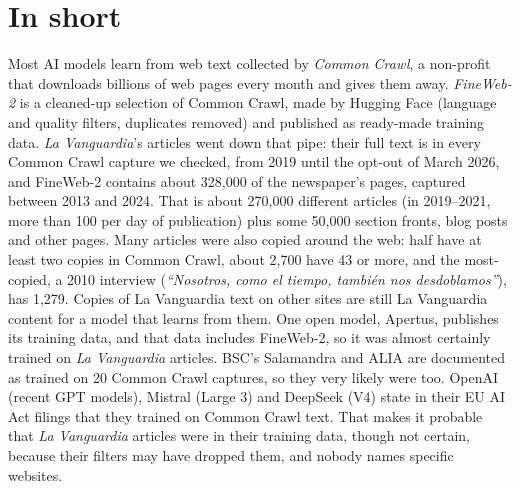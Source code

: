 \documentclass[10pt,a4paper]{article}
\begin{document}
\section*{In short}
Most AI models learn from web text collected by \emph{Common Crawl}, a non-profit that downloads billions of web
pages every month and gives them away. \emph{FineWeb-2} is a cleaned-up selection of Common Crawl, made by Hugging
Face (language and quality filters, duplicates removed) and published as ready-made training data. \emph{La
Vanguardia}'s articles went down that pipe: their full text is in every Common Crawl capture we checked, from 2019
until the opt-out of March 2026, and FineWeb-2 contains about 328,000 of the newspaper's pages, captured between 2013
and 2024. That is about 270,000 different articles (in 2019--2021, more than 100 per day of publication) plus some
50,000 section fronts, blog posts and other pages. Many articles were also copied around the web: half have at least two
copies in Common Crawl, about 2,700 have 43 or more, and the most-copied, a 2010 interview (\emph{``Nosotros, como el
tiempo, también nos desdoblamos''}), has 1,279. Copies of La Vanguardia text on other sites are still La Vanguardia
content for a model that learns from them. One open model, Apertus, publishes its training data, and that
data includes FineWeb-2, so it was almost certainly trained on \emph{La Vanguardia} articles. BSC's Salamandra and ALIA are documented
as trained on 20 Common Crawl captures, so they very likely were too. OpenAI (recent GPT models), Mistral (Large 3) and
DeepSeek (V4) state in their EU AI Act filings that they trained on Common Crawl text. That makes it probable that \emph{La Vanguardia}
articles were in their training data, though not certain, because their filters may have dropped them, and nobody names
specific websites.
\end{document}
